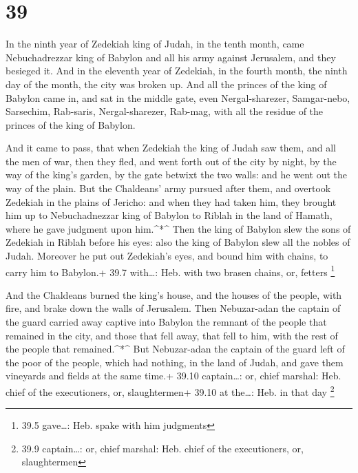\hypertarget{section-38}{%
\section{39}\label{section-38}}

 In the ninth year of Zedekiah king of Judah, in the tenth
month, came Nebuchadrezzar king of Babylon and all his army against
Jerusalem, and they besieged it.  And in the eleventh year
of Zedekiah, in the fourth month, the ninth day of the month, the city
was broken up.  And all the princes of the king of Babylon
came in, and sat in the middle gate, even Nergal-sharezer, Samgar-nebo,
Sarsechim, Rab-saris, Nergal-sharezer, Rab-mag, with all the residue of
the princes of the king of Babylon.

 And it came to pass, that when Zedekiah the king of Judah
saw them, and all the men of war, then they fled, and went forth out of
the city by night, by the way of the king's garden, by the gate betwixt
the two walls: and he went out the way of the plain.  But
the Chaldeans' army pursued after them, and overtook Zedekiah in the
plains of Jericho: and when they had taken him, they brought him up to
Nebuchadnezzar king of Babylon to Riblah in the land of Hamath, where he
gave judgment upon him.\^{}*\^{}  Then the king of Babylon
slew the sons of Zedekiah in Riblah before his eyes: also the king of
Babylon slew all the nobles of Judah.  Moreover he put out
Zedekiah's eyes, and bound him with chains, to carry him to Babylon.+
39.7 with\ldots: Heb. with two brasen chains, or, fetters \footnote{39.5
  gave\ldots: Heb. spake with him judgments}

 And the Chaldeans burned the king's house, and the houses
of the people, with fire, and brake down the walls of Jerusalem.
 Then Nebuzar-adan the captain of the guard carried away
captive into Babylon the remnant of the people that remained in the
city, and those that fell away, that fell to him, with the rest of the
people that remained.\^{}*\^{}  But Nebuzar-adan the
captain of the guard left of the poor of the people, which had nothing,
in the land of Judah, and gave them vineyards and fields at the same
time.+ 39.10 captain\ldots: or, chief marshal: Heb. chief of the
executioners, or, slaughtermen+ 39.10 at the\ldots: Heb. in that day
\footnote{39.9 captain\ldots: or, chief marshal: Heb. chief of the
  executioners, or, slaughtermen}

